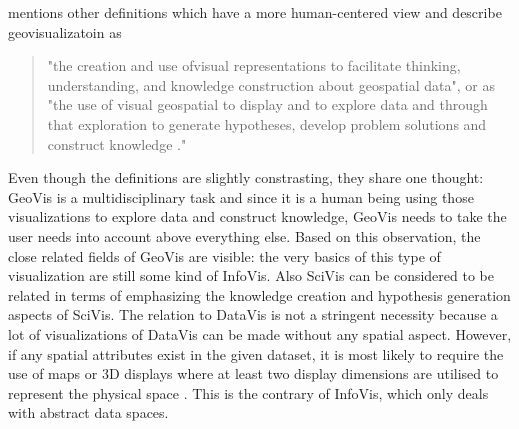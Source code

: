 \begin{enumerate}
\citeauthor{Noellenburg2007} mentions other definitions which have a more human-centered view and describe geovisualizatoin as
\begin{quote}
"the creation and use ofvisual representations to facilitate thinking, understanding, and knowledge construction about geospatial data", or as "the use of visual geospatial to display and to explore data and through that exploration to generate hypotheses, develop problem solutions and construct knowledge ."
\end{quote}

Even though the definitions are slightly constrasting, they share one thought: \ac{GeoVis} is a multidisciplinary task and since it is a human being using those visualizations to explore data and construct knowledge, \ac{GeoVis} needs to take the user needs into account above everything else.
Based on this observation, the close related fields of \ac{GeoVis} are visible: the very basics of this type of visualization are still some kind of \ac{InfoVis}. Also \ac{SciVis} can be considered to be related in terms of emphasizing the knowledge creation and hypothesis generation aspects of \ac{SciVis}. The relation to \ac{DataVis} is not a stringent necessity because a lot of visualizations of \ac{DataVis} can be made without any spatial aspect. However, if any spatial attributes exist in the given dataset, it is most likely to require the use of maps or 3D displays where at least two display dimensions are utilised to represent the physical space .
This is the contrary of \ac{InfoVis}, which only deals with abstract data spaces.
\end{enumerate}